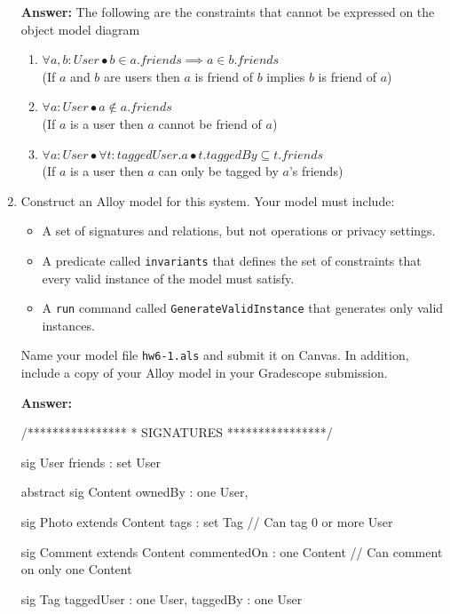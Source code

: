 \begin{enumerate}
        \textbf {Answer:} The following are the constraints that cannot be expressed on the object model diagram
            \begin {enumerate}
                \item $ \forall a, b: User \bullet b \in a.friends \implies a \in b.friends $\\
(If $a$ and $b$ are users then $a$ is friend of $b$ implies $b$ is friend of $a$)
                \item $ \forall a : User \bullet a \notin a.friends $\\
                    (If $a$ is a user then $a$ cannot be friend of $a$)
                \item $ \forall a : User \bullet \forall t : taggedUser.a \bullet t.taggedBy \subseteq t.friends $ \\
                    (If $a$ is a user then $a$ can only be tagged by $a$’s friends)
            \end {enumerate}
	\item Construct an Alloy model for this system. Your model must
	      include:
	      \begin{itemize}
		      \item A set of signatures and relations, but not operations or
		            privacy settings.
		      \item A predicate called \texttt{invariants} that defines the
		            set of constraints that every valid instance of the model must satisfy.
		      \item A \texttt{run} command called \texttt{GenerateValidInstance} that generates only valid instances.
	      \end{itemize}
	      Name your model file \texttt{hw6-1.als}  and submit it on
	      Canvas. In addition, include a copy of your Alloy model in your
	      Gradescope submission. 

          \smallskip \textbf{Answer:} 
          \begin{alloy}
/****************
 * SIGNATURES
 ****************/

sig User {
  friends : set User
}

abstract sig Content {
  ownedBy : one User,
}

sig Photo extends Content {
    tags : set Tag  // Can tag 0 or more User
}

sig Comment extends Content {
  commentedOn : one Content // Can comment on only one Content
}

sig Tag {
    taggedUser : one User,
    taggedBy : one User
}


\end{alloy}
\end{enumerate}
